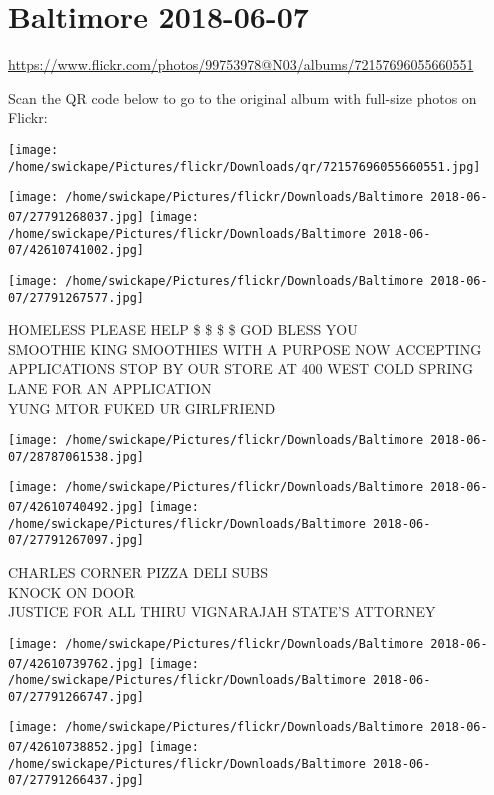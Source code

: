 \documentclass[10pt,letterpaper]{article}
\title{}
\author{}
\date{}
\begin{document}
\section*{Baltimore 2018-06-07}

\url{https://www.flickr.com/photos/99753978@N03/albums/72157696055660551}

Scan the QR code below to go to the original album with full-size photos on Flickr:

\texttt{[image: /home/swickape/Pictures/flickr/Downloads/qr/72157696055660551.jpg]}
\pagebreak

\texttt{[image: /home/swickape/Pictures/flickr/Downloads/Baltimore 2018-06-07/27791268037.jpg]}
\texttt{[image: /home/swickape/Pictures/flickr/Downloads/Baltimore 2018-06-07/42610741002.jpg]}

\texttt{[image: /home/swickape/Pictures/flickr/Downloads/Baltimore 2018-06-07/27791267577.jpg]}

HOMELESS PLEASE HELP \$ \$ \$ \$ GOD BLESS YOU\\
SMOOTHIE KING SMOOTHIES WITH A PURPOSE NOW ACCEPTING APPLICATIONS STOP BY OUR STORE AT 400 WEST COLD SPRING LANE FOR AN APPLICATION\\
YUNG MTOR FUKED UR GIRLFRIEND
\pagebreak

\texttt{[image: /home/swickape/Pictures/flickr/Downloads/Baltimore 2018-06-07/28787061538.jpg]}

\vspace{0.25in}
\texttt{[image: /home/swickape/Pictures/flickr/Downloads/Baltimore 2018-06-07/42610740492.jpg]}
\texttt{[image: /home/swickape/Pictures/flickr/Downloads/Baltimore 2018-06-07/27791267097.jpg]}

CHARLES CORNER PIZZA DELI SUBS\\
KNOCK ON DOOR\\
JUSTICE FOR ALL THIRU VIGNARAJAH STATE'S ATTORNEY
\pagebreak

\texttt{[image: /home/swickape/Pictures/flickr/Downloads/Baltimore 2018-06-07/42610739762.jpg]}
\texttt{[image: /home/swickape/Pictures/flickr/Downloads/Baltimore 2018-06-07/27791266747.jpg]}

\texttt{[image: /home/swickape/Pictures/flickr/Downloads/Baltimore 2018-06-07/42610738852.jpg]}
\texttt{[image: /home/swickape/Pictures/flickr/Downloads/Baltimore 2018-06-07/27791266437.jpg]}
\end{document}
